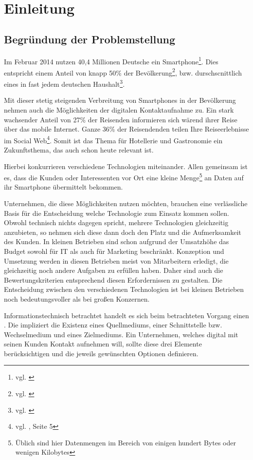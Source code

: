 \section{Einleitung}
\label{sec:einleitung}

\subsection{Begründung der Problemstellung} %

Im Februar 2014 nutzen 40,4 Millionen Deutsche ein Smartphone\footnote{vgl. \cite{netzoekonom}}. Dies entspricht einem Anteil von knapp 50\% der Bevölkerung\footnote{vgl. \cite{destatis:bev}}, bzw. durschscnittlich eines in fast jedem deutschen Haushalt\footnote{vgl. \cite{destatis:hh}}. 

Mit dieser stetig steigenden Verbreitung von Smartphones in der Bevölkerung nehmen auch die Möglichkeiten der digitalen Kontaktaufnahme zu. 
Ein stark wachsender Anteil von 27\% der Reisenden informieren sich wärend ihrer Reise über das mobile Internet. Ganze 36\% der Reisendenden  teilen Ihre Reiseerlebnisse im Social Web\footnote{vgl. \cite{reiseanalyse}, Seite 5}. Somit ist das Thema für Hotellerie und Gastronomie ein Zukunftsthema, das auch schon heute relevant ist.

Hierbei konkurrieren verschiedene Technologien miteinander. Allen gemeinsam ist es, dass die Kunden oder Interessenten vor Ort eine kleine Menge\footnote{Üblich sind hier Datenmengen im Bereich von einigen hundert Bytes oder wenigen Kilobytes} an Daten auf ihr Smartphone übermittelt bekommen.

Unternehmen, die diese Möglichkeiten nutzen möchten, brauchen eine verlässliche Basis für die Entscheidung welche Technologie zum Einsatz kommen sollen. Obwohl technisch nichts dagegen spricht, mehrere Technologien gleichzeitig anzubieten, so nehmen sich diese dann doch den Platz und die Aufmerksamkeit des Kunden. In kleinen Betrieben sind schon aufgrund der Umsatzhöhe das Budget sowohl für IT als auch für Marketing beschränkt. Konzeption und Umsetzung werden in diesen Betrieben meist von Mitarbeitern erledigt, die gleichzeitig noch andere Aufgaben zu erfüllen haben. Daher sind auch die Bewertungskriterien entsprechend diesen Erfordernissen zu gestalten. Die Entscheidung zwischen den verschiedenen Technologien ist bei kleinen Betrieben noch bedeutungsvoller als bei großen Konzernen.

Informationstechnisch betrachtet handelt es sich beim betrachteten Vorgang einen . Die impliziert die Existenz eines Quellmediums, einer Schnittstelle bzw. Wechselmedium und eines Zielmediums. Ein Unternehmen, welches digital mit seinen Kunden Kontakt aufnehmen will, sollte diese drei Elemente berücksichtigen und die jeweils gewünschten Optionen definieren.

